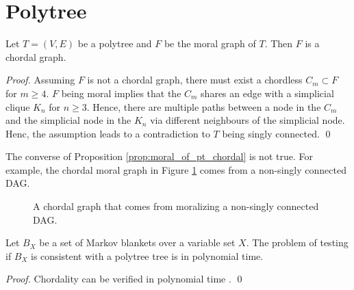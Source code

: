 \newpage
\section{Polytree}
\begin{proposition}
\label{prop:moral_of_pt_chordal}
Let $T=(V,E)$ be a polytree and $F$ be the moral graph of $T$. Then $F$ is a chordal graph. 
\end{proposition}
\begin{proof}
Assuming $F$ is not a chordal graph, there must exist a chordless $C_m \subset F$ for $m\ge 4$. $F$ being moral implies that the $C_m$ shares an edge with a simplicial clique $K_n$ for $n \ge 3$. Hence, there are multiple paths between a node in the $C_m$ and the simplicial node in the $K_n$ via different neighbours of the simplicial node. Henc, the assumption leads to a contradiction to $T$ being singly connected. \qed
\end{proof}

The converse of Proposition \ref{prop:moral_of_pt_chordal} is not true. For example, the chordal moral graph in Figure \ref{fg:chordal_over_4nodes} comes from a non-singly connected DAG. 
\begin{figure}[H]
\centering
{}
\caption{A chordal graph that comes from moralizing a non-singly connected DAG.}
\label{fg:chordal_over_4nodes}
\end{figure}

\begin{corollary}
Let $B_X$ be a set of Markov blankets over a variable set $X$. The problem of testing if $B_X$ is consistent with a polytree tree is in polynomial time.
\end{corollary}
\begin{proof}
Chordality can be verified in polynomial time \cite{tarjan1984simple}. \qed
\end{proof}

